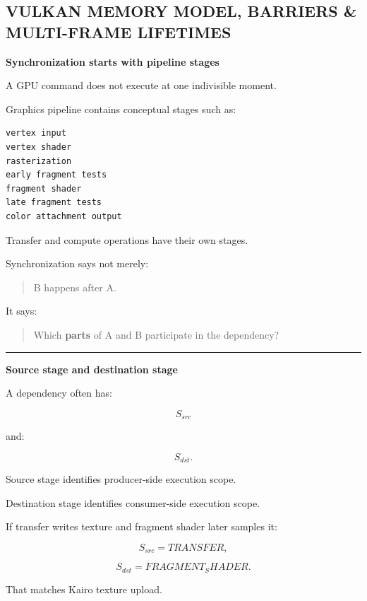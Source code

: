 \subsection{VULKAN MEMORY MODEL, BARRIERS \& MULTI-FRAME LIFETIMES}\label{01-foundations-i-ch014-vulkan-memory-model-barriers-multi-frame-lifetimes}

\hypertarget{01-foundations-i-ch014-vulkan-memory-model-barriers-multi-frame-lifetimes}{}

\textbf{Synchronization starts with pipeline stages}

A GPU command does not execute at one indivisible moment.

Graphics pipeline contains conceptual stages such as:

\begin{verbatim}
vertex input
vertex shader
rasterization
early fragment tests
fragment shader
late fragment tests
color attachment output
\end{verbatim}

Transfer and compute operations have their own stages.

Synchronization says not merely:

\begin{quote}
B happens after A.
\end{quote}

It says:

\begin{quote}
Which \textbf{parts} of A and B participate in the dependency?
\end{quote}

\begin{center}\rule{0.5\linewidth}{0.5pt}\end{center}

\textbf{Source stage and destination stage}

A dependency often has:

\[
S_{src}
\]

and:

\[
S_{dst}.
\]

Source stage identifies producer-side execution scope.

Destination stage identifies consumer-side execution scope.

If transfer writes texture and fragment shader later samples it:

\[
S_{src}
=
TRANSFER,
\]

\[
S_{dst}
=
FRAGMENT_SHADER.
\]

That matches Kairo texture upload.

